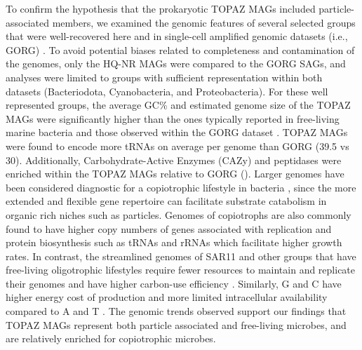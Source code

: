 \documentclass[12pt]{article}
\numberwithin{equation}{section}
\begin{document}
To confirm the hypothesis that the prokaryotic TOPAZ MAGs included particle-associated members, we examined the genomic features of several selected groups that were well-recovered here and in single-cell amplified genomic datasets (i.e., GORG) \citep{Pachiadaki_2019}.  To avoid potential biases related to completeness and contamination of the genomes, only the HQ-NR MAGs were compared to the GORG SAGs, and analyses were limited to groups with sufficient representation within both datasets (Bacteriodota, Cyanobacteria, and Proteobacteria). For these well represented groups, the average GC\% and estimated genome size of the TOPAZ MAGs were significantly higher than the ones typically reported in free-living marine bacteria \citep{Dufresne_2005, Swan_2013, Luo_2015} and those observed within the GORG dataset \citep{Pachiadaki_2019}. TOPAZ MAGs were found to encode more tRNAs on average per genome than GORG (39.5 vs 30). Additionally, Carbohydrate-Active Enzymes (CAZy) and peptidases were enriched within the TOPAZ MAGs relative to GORG ().  Larger genomes have been considered diagnostic for a copiotrophic lifestyle in bacteria \citep{Okie_2020}, since the more extended and flexible gene repertoire can facilitate substrate catabolism in organic rich niches such as particles. Genomes of copiotrophs are also commonly found to have higher copy numbers of genes associated with replication and protein biosynthesis such as tRNAs and rRNAs \citep{Rocha_2004} which facilitate higher growth rates. In contrast, the streamlined genomes of SAR11 and other groups that have free-living oligotrophic lifestyles require fewer resources to maintain and replicate their genomes and have higher carbon-use efficiency \citep{Giovannoni_2014}. Similarly, G and C have higher energy cost of production and more limited intracellular availability compared to A and T \citep{Moore_2013, Luo_2015}. The genomic trends observed support our findings that TOPAZ MAGs represent both particle associated and free-living microbes, and are relatively enriched for copiotrophic microbes.
\end{document}
